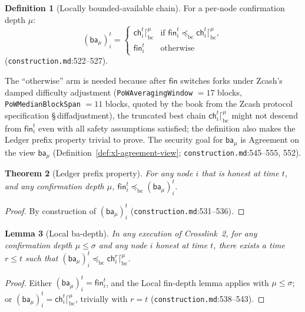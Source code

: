 \documentclass[11pt,a4paper]{article}
\newtheorem{theorem}{Theorem}[section]
\newtheorem{lemma}[theorem]{Lemma}
\theoremstyle{definition}
\newtheorem{definition}[theorem]{Definition}
\begin{document}
\begin{definition}[Locally bounded-available chain]\label{def:xl-ba}
For a per-node confirmation depth $\mu$:
\[
(\mathsf{ba}_{\mu})_i^t =
\begin{cases}
\mathsf{ch}_i^t \lceil^{\mu}_{\mathrm{bc}} &
  \text{if } \mathsf{fin}_i^t \preceq_{\mathrm{bc}} \mathsf{ch}_i^t
  \lceil^{\mu}_{\mathrm{bc}},\\
\mathsf{fin}_i^t & \text{otherwise}
\end{cases}
\]
(\texttt{construction.md}:522--527).
\end{definition}

The ``otherwise'' arm is needed because after $\mathsf{fin}$ switches
forks under Zcash's damped difficulty adjustment
(\texttt{PoWAveragingWindow} $= 17$ blocks, \texttt{PoWMedianBlockSpan}
$= 11$ blocks, quoted by the book from the Zcash protocol specification
\S\,diffadjustment), the truncated best chain $\mathsf{ch}_i^t
\lceil^{\mu}_{\mathrm{bc}}$ might not descend from $\mathsf{fin}_i^t$
even with all safety assumptions satisfied; the definition also makes the
Ledger prefix property trivial to prove. The security goal for
$\mathsf{ba}_{\mu}$ is Agreement on the view $\mathsf{ba}_{\mu}$
(Definition~\ref{def:xl-agreement-view};
\texttt{construction.md}:545--555, 552).

\begin{theorem}[Ledger prefix property]\label{thm:xl-ledger-prefix}
For any node $i$ that is honest at time $t$, and any confirmation depth
$\mu$, $\mathsf{fin}_i^t \preceq_{\mathrm{bc}} (\mathsf{ba}_{\mu})_i^t$.
\end{theorem}
\begin{proof}
By construction of $(\mathsf{ba}_{\mu})_i^t$
(\texttt{construction.md}:531--536).
\end{proof}

\begin{lemma}[Local ba-depth]\label{lem:xl-ba-depth}
In any execution of Crosslink~2, for any confirmation depth $\mu \le
\sigma$ and any node $i$ honest at time $t$, there exists a time $r \le
t$ such that $(\mathsf{ba}_{\mu})_i^t \preceq_{\mathrm{bc}}
\mathsf{ch}_i^r \lceil^{\mu}_{\mathrm{bc}}$.
\end{lemma}
\begin{proof}
Either $(\mathsf{ba}_{\mu})_i^t = \mathsf{fin}_i^t$, and the Local
fin-depth lemma applies with $\mu \le \sigma$; or $(\mathsf{ba}_{\mu})_i^t
= \mathsf{ch}_i^t \lceil^{\mu}_{\mathrm{bc}}$, trivially with $r = t$
(\texttt{construction.md}:538--543).
\end{proof}
\end{document}
